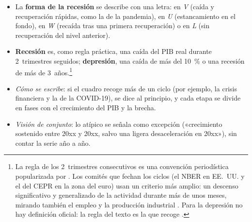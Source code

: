 \documentclass[11pt]{article}
\begin{document}
\begin{itemize}
\item La \textbf{forma de la recesión} se describe con una letra: en \emph{V} (caída y recuperación rápidas, como la de la pandemia), en \emph{U} (estancamiento en el fondo), en \emph{W} (recaída tras una primera recuperación) o en \emph{L} (sin recuperación del nivel anterior).
\item \textbf{Recesión} es, como regla práctica, una caída del PIB real durante 2~trimestres seguidos; \textbf{depresión}, una caída de más del 10~\% o una recesión de más de 3~años.\footnote{La regla de los 2~trimestres consecutivos es una convención periodística popularizada por \textcite{Shiskin1974}. Los comités que fechan los ciclos (el NBER en EE.~UU. y el del CEPR en la zona del euro) usan un criterio más amplio: un descenso significativo y generalizado de la actividad durante más de unos meses, mirando también el empleo y la producción industrial \parencite{NBER2023Fechado}. Para la depresión no hay definición oficial: la regla del texto es la que recoge \textcite{Economist2008Depression}.}
\item \emph{Cómo se escribe}: si el cuadro recoge más de un ciclo (por ejemplo, la crisis financiera y la de la COVID-19), se dice al principio, y cada etapa se divide en fases con el crecimiento del PIB y la brecha.
\item \emph{Visión de conjunto}: lo atípico se señala como excepción («crecimiento sostenido entre 20xx y 20xx, salvo una ligera desaceleración en 20xx»), sin contar la serie año a año.
\end{itemize}
\end{document}
